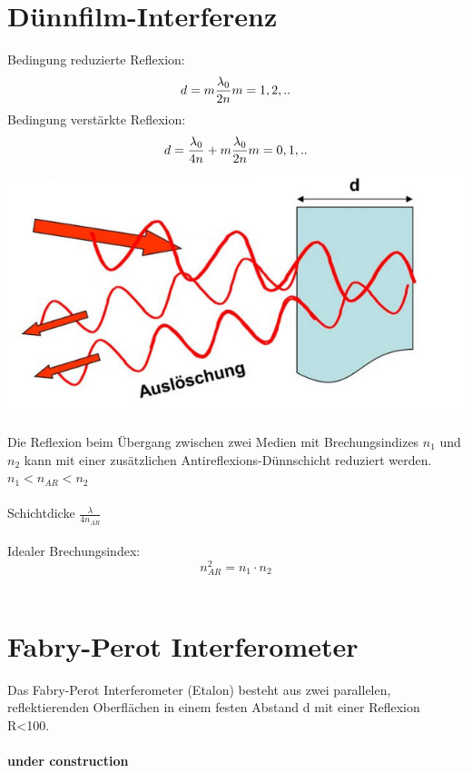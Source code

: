 \section{Dünnfilm-Interferenz}
Bedingung reduzierte Reflexion:
\[
	d=m\frac{\lambda_0}{2n} \\ m=1,2,.. \\ \\
\]
Bedingung verstärkte Reflexion:
\[
	d=\frac{\lambda_0}{4n}+m\frac{\lambda_0}{2n} \\ m=0,1,..\\ \\
\]
\begin{center}
	\includegraphics[scale = 0.2]{../fig/df_interferenz.jpg}
\end{center}
Die Reflexion beim Übergang zwischen zwei Medien mit Brechungsindizes $n_1$ und $n_2$ kann mit einer zusätzlichen Antireflexions-Dünnschicht reduziert werden. \\
$n_1< n_{AR}<n_2$ \\
\\
Schichtdicke $\frac{\lambda}{4 n_{AR}}$
\\
\\
Idealer Brechungsindex:
\[
	 n_{AR}^2=n_1\cdot n_2
\]
\\
\section{Fabry-Perot Interferometer}
Das Fabry-Perot Interferometer (Etalon) besteht aus zwei parallelen, reflektierenden Oberflächen in einem festen Abstand d mit einer Reflexion R<100. 
\\
\\
\textbf{ under construction}
\\
